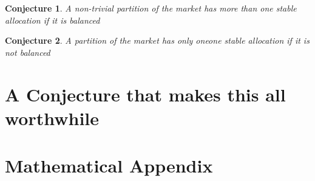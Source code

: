 \documentclass[WP]{AEA}
\newtheorem{conj}{Conjecture}
\begin{document}
\begin{conj}
	A non-trivial partition of the market has more than one stable allocation if it is balanced
\end{conj}
	
\begin{conj}
		A partition of the market has only oneone stable allocation if it is not balanced
\end{conj}
	

\section{A Conjecture that makes this all worthwhile}






\appendix



\section{Mathematical Appendix}
\end{document}
